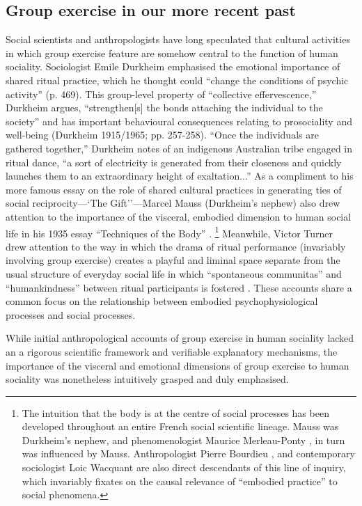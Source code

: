 \begin{CJK}{UTF8}{gbsn}
\subsection{Group exercise in our more recent past}
Social scientists and anthropologists have long speculated that cultural activities in which group exercise feature are somehow central to the function of human sociality.  Sociologist Emile Durkheim emphasised the emotional importance of shared ritual practice, which he thought could ``change the conditions of psychic activity'' (p. 469).  This group-level property of ``collective effervescence,'' Durkheim argues, ``strengthen[s] the bonds attaching the individual to the society'' and has important behavioural consequences relating to prosociality and well-being (Durkheim 1915/1965; pp. 257-258). ``Once the individuals are gathered together,'' Durkheim notes of an indigenous Australian tribe engaged in ritual dance, ``a sort of electricity is generated from their closeness and quickly launches them to an extraordinary height of exaltation...''  As a compliment to his more famous essay on the role of shared cultural practices in generating ties of social reciprocity---`The Gift''---Marcel Mauss (Durkheim's nephew) also drew attention to the importance of the visceral, embodied dimension to human social life in his 1935 essay ``Techniques of the Body'' \citep{Mauss1935}.
    \footnote{The intuition that the body is at the centre of social processes has been developed throughout an entire French social scientific lineage.  Mauss was Durkheim's nephew, and phenomenologist Maurice Merleau-Ponty \citep{Merleau-Ponty1956}, in turn was influenced by Mauss.  Anthropologist Pierre Bourdieu \citep{Bourdieu1990}, and contemporary sociologist Loic Wacquant \citep{Wacquant2004} are also direct descendants of this line of inquiry, which invariably fixates on the causal relevance of ``embodied practice'' to social phenomena.}
Meanwhile, Victor Turner drew attention to the way in which the drama of ritual performance (invariably involving group exercise) creates a playful and liminal space separate from the usual structure of everyday social life in which ``spontaneous communitas'' and ``humankindness'' between ritual participants is fostered \citep{Turner1974}.  These accounts share a common focus on the relationship between embodied psychophysiological processes and social processes.

While initial anthropological accounts of group exercise in human sociality lacked an a rigorous scientific framework and verifiable explanatory mechanisms, the importance of the visceral and emotional dimensions of group exercise to human sociality was nonetheless intuitively grasped and duly emphasised.


\end{CJK}
